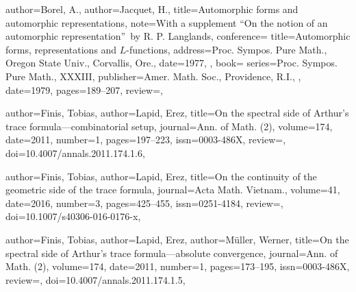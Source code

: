 \documentclass[11pt]{amsart}
\theoremstyle{remark}
\begin{document}
\begin{bibdiv}
\begin{biblist}


    {
       author={Borel, A.},
       author={Jacquet, H.},
       title={Automorphic forms and automorphic representations},
       note={With a supplement ``On the notion of an automorphic
       representation''\ by R. P. Langlands},
       conference={
          title={Automorphic forms, representations and $L$-functions},
          address={Proc. Sympos. Pure Math., Oregon State Univ., Corvallis,
          Ore.},
          date={1977},
       },
       book={
          series={Proc. Sympos. Pure Math., XXXIII},
          publisher={Amer. Math. Soc., Providence, R.I.},
       },
       date={1979},
       pages={189--207},
       review={},
    }
    
    {
       author={Finis, Tobias},
       author={Lapid, Erez},
       title={On the spectral side of Arthur's trace formula---combinatorial setup},
       journal={Ann. of Math. (2)},
       volume={174},
       date={2011},
       number={1},
       pages={197--223},
       issn={0003-486X},
       review={},
       doi={10.4007/annals.2011.174.1.6},
    }

   {
	   author={Finis, Tobias},
	   author={Lapid, Erez},
	   title={On the continuity of the geometric side of the trace formula},
	   journal={Acta Math. Vietnam.},
	   volume={41},
	   date={2016},
	   number={3},
	   pages={425--455},
	   issn={0251-4184},
	   review={},
	   doi={10.1007/s40306-016-0176-x},
	}

    {
       author={Finis, Tobias},
       author={Lapid, Erez},
       author={M{\"u}ller, Werner},
       title={On the spectral side of Arthur's trace formula---absolute
       convergence},
       journal={Ann. of Math. (2)},
       volume={174},
       date={2011},
       number={1},
       pages={173--195},
       issn={0003-486X},
       review={},
       doi={10.4007/annals.2011.174.1.5},
    }
    

\end{biblist}
\end{bibdiv}
\end{document}
